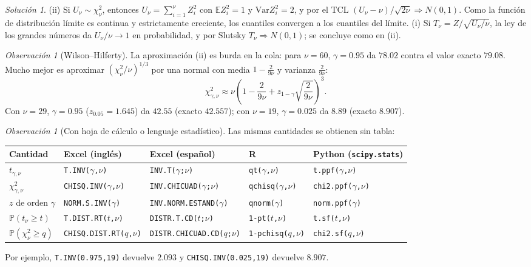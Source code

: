 \documentclass[11pt]{article}
\theoremstyle{plain}
\theoremstyle{definition}
\theoremstyle{remark}
\newtheorem{remark}[theorem]{Observación}
\theoremstyle{solstyle}
\newtheorem*{solution}{Solución}
\newcommand{\E}{\mathbb{E}}
\newcommand{\Var}{\mathrm{Var}}
\newcommand{\Pbb}{\mathbb{P}}
\newcommand{\1}{\mathbbm{1}}
\begin{document}
\begin{solution}
(ii) Si $U_\nu\sim\chi^2_\nu$, entonces $U_\nu=\sum_{i=1}^\nu Z_i^2$ con $\E Z_i^2=1$ y $\Var Z_i^2=2$, y por el TCL $(U_\nu-\nu)/\sqrt{2\nu}\Rightarrow N(0,1)$. Como la función de distribución límite es continua y estrictamente creciente, los cuantiles convergen a los cuantiles del límite.
(i) Si $T_\nu=Z/\sqrt{U_\nu/\nu}$, la ley de los grandes números da $U_\nu/\nu\to 1$ en probabilidad, y por Slutsky $T_\nu\Rightarrow N(0,1)$; se concluye como en (ii).
\end{solution}

\begin{remark}[Wilson--Hilferty]
La aproximación (ii) es burda en la cola: para $\nu=60$, $\gamma=0.95$ da $78.02$ contra el valor exacto $79.08$. Mucho mejor es aproximar $(\chi^2_\nu/\nu)^{1/3}$ por una normal con media $1-\frac{2}{9\nu}$ y varianza $\frac{2}{9\nu}$:
\[
\chi^2_{\gamma,\nu}\approx \nu\left(1-\frac{2}{9\nu}+z_{1-\gamma}\sqrt{\frac{2}{9\nu}}\right)^{3}.
\]
Con $\nu=29$, $\gamma=0.95$ ($z_{0.05}=1.645$) da $42.55$ (exacto $42.557$); con $\nu=19$, $\gamma=0.025$ da $8.89$ (exacto $8.907$).
\end{remark}

\begin{remark}[Con hoja de cálculo o lenguaje estadístico]
Las mismas cantidades se obtienen sin tabla:
\begin{center}
\footnotesize
\setlength{\tabcolsep}{4pt}
\renewcommand{\arraystretch}{1.3}
\begin{tabular}{lllll}
\toprule
Cantidad & Excel (inglés) & Excel (español) & R & Python (\texttt{scipy.stats}) \\
\midrule
$t_{\gamma,\nu}$ & \texttt{T.INV($\gamma$,$\nu$)} & \texttt{INV.T($\gamma$;$\nu$)} & \texttt{qt($\gamma$,$\nu$)} & \texttt{t.ppf($\gamma$,$\nu$)} \\
$\chi^2_{\gamma,\nu}$ & \texttt{CHISQ.INV($\gamma$,$\nu$)} & \texttt{INV.CHICUAD($\gamma$;$\nu$)} & \texttt{qchisq($\gamma$,$\nu$)} & \texttt{chi2.ppf($\gamma$,$\nu$)} \\
$z$ de orden $\gamma$ & \texttt{NORM.S.INV($\gamma$)} & \texttt{INV.NORM.ESTAND($\gamma$)} & \texttt{qnorm($\gamma$)} & \texttt{norm.ppf($\gamma$)} \\
$\Pbb(t_\nu\ge t)$ & \texttt{T.DIST.RT($t$,$\nu$)} & \texttt{DISTR.T.CD($t$;$\nu$)} & \texttt{1-pt($t$,$\nu$)} & \texttt{t.sf($t$,$\nu$)} \\
$\Pbb(\chi^2_\nu\ge q)$ & \texttt{CHISQ.DIST.RT($q$,$\nu$)} & \texttt{DISTR.CHICUAD.CD($q$;$\nu$)} & \texttt{1-pchisq($q$,$\nu$)} & \texttt{chi2.sf($q$,$\nu$)} \\
\bottomrule
\end{tabular}
\end{center}
Por ejemplo, \texttt{T.INV(0.975,19)} devuelve $2.093$ y \texttt{CHISQ.INV(0.025,19)} devuelve $8.907$.
\end{remark}
\end{document}
